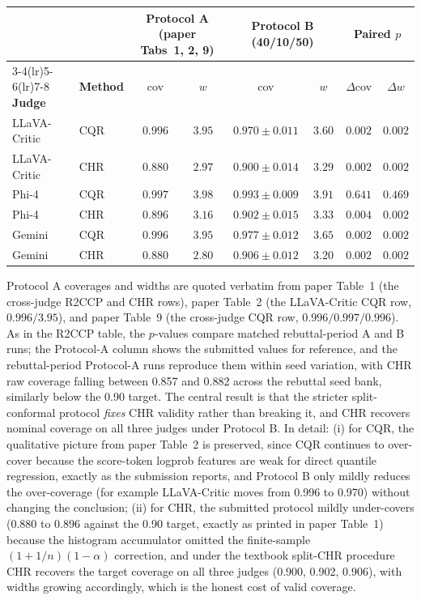 \documentclass[11pt]{article}
\begin{document}
\begin{center}
\footnotesize
\setlength{\tabcolsep}{4pt}
\begin{tabular}{ll cc cc cc}
\toprule
 & & \multicolumn{2}{c}{\textbf{Protocol A (paper Tabs~1, 2, 9)}} & \multicolumn{2}{c}{\textbf{Protocol B (40/10/50)}} & \multicolumn{2}{c}{\textbf{Paired $p$}} \\
\cmidrule(lr){3-4}\cmidrule(lr){5-6}\cmidrule(lr){7-8}
\textbf{Judge} & \textbf{Method} & cov & $w$ & cov & $w$ & $\Delta$cov & $\Delta w$ \\
\midrule
LLaVA-Critic & CQR & $0.996$ & $3.95$ & $0.970 \pm 0.011$ & $3.60$ & $0.002$ & $0.002$ \\
LLaVA-Critic & CHR & $0.880$ & $2.97$ & $\mathbf{0.900 \pm 0.014}$ & $3.29$ & $0.002$ & $0.002$ \\
Phi-4        & CQR & $0.997$ & $3.98$ & $0.993 \pm 0.009$ & $3.91$ & $0.641$ & $0.469$ \\
Phi-4        & CHR & $0.896$ & $3.16$ & $\mathbf{0.902 \pm 0.015}$ & $3.33$ & $0.004$ & $0.002$ \\
Gemini       & CQR & $0.996$ & $3.95$ & $0.977 \pm 0.012$ & $3.65$ & $0.002$ & $0.002$ \\
Gemini       & CHR & $0.880$ & $2.80$ & $\mathbf{0.906 \pm 0.012}$ & $3.20$ & $0.002$ & $0.002$ \\
\bottomrule
\end{tabular}
\end{center}

Protocol A coverages and widths are quoted verbatim from paper Table~1 (the cross-judge R2CCP and CHR rows), paper Table~2 (the LLaVA-Critic CQR row, $0.996/3.95$), and paper Table~9 (the cross-judge CQR row, $0.996/0.997/0.996$). As in the R2CCP table, the $p$-values compare matched rebuttal-period A and B runs; the Protocol-A column shows the submitted values for reference, and the rebuttal-period Protocol-A runs reproduce them within seed variation, with CHR raw coverage falling between 0.857 and 0.882 across the rebuttal seed bank, similarly below the 0.90 target. The central result is that the stricter split-conformal protocol \emph{fixes} CHR validity rather than breaking it, and CHR recovers nominal coverage on all three judges under Protocol B. In detail: (i) for CQR, the qualitative picture from paper Table~2 is preserved, since CQR continues to over-cover because the score-token logprob features are weak for direct quantile regression, exactly as the submission reports, and Protocol B only mildly reduces the over-coverage (for example LLaVA-Critic moves from 0.996 to 0.970) without changing the conclusion; (ii) for CHR, the submitted protocol mildly under-covers (0.880 to 0.896 against the 0.90 target, exactly as printed in paper Table~1) because the histogram accumulator omitted the finite-sample $(1 + 1/n)(1 - \alpha)$ correction, and under the textbook split-CHR procedure CHR recovers the target coverage on all three judges (0.900, 0.902, 0.906), with widths growing accordingly, which is the honest cost of valid coverage.
\end{document}
